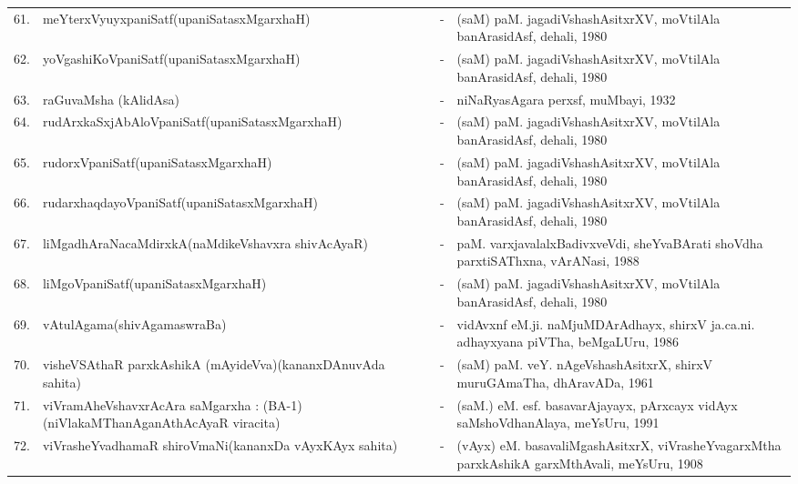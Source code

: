{\begin{longtable}{rp{6cm}cp{9cm}<{\raggedright}}
61. & meYterxVyuyxpaniSatf\newline (upaniSatasxMgarxhaH) &-& (saM) paM. jagadiVshashAsitxrXV, moVtilAla banArasidAsf, dehali, 1980\\
62. & yoVgashiKoVpaniSatf\newline (upaniSatasxMgarxhaH) &-& (saM) paM. jagadiVshashAsitxrXV, moVtilAla banArasidAsf, dehali, 1980\\
63. & raGuvaMsha (kAlidAsa) &-& niNaRyasAgara perxsf, muMbayi, 1932\\
64. & rudArxkaSxjAbAloVpaniSatf\newline (upaniSatasxMgarxhaH) &-& (saM) paM. jagadiVshashAsitxrXV, moVtilAla banArasidAsf, dehali, 1980\\
65. & rudorxVpaniSatf\newline (upaniSatasxMgarxhaH) &-& (saM) paM. jagadiVshashAsitxrXV, moVtilAla banArasidAsf, dehali, 1980\\
66. & rudarxhaqdayoVpaniSatf\newline (upaniSatasxMgarxhaH) &-& (saM) paM. jagadiVshashAsitxrXV, moVtilAla banArasidAsf, dehali, 1980\\
67. & liMgadhAraNacaMdirxkA\newline (naMdikeVshavxra shivAcAyaR) &-& paM. varxjavalalxBadivxveVdi, sheYvaBArati shoVdha parxtiSAThxna, vArANasi, 1988\\
68. & liMgoVpaniSatf\newline (upaniSatasxMgarxhaH) &-& (saM) paM. jagadiVshashAsitxrXV, moVtilAla banArasidAsf, dehali, 1980\\
69. & vAtulAgama\newline (shivAgamaswraBa) &-& vidAvxnf eM.ji. naMjuMDArAdhayx, shirxV ja.ca.ni. adhayxyana piVTha, beMgaLUru, 1986\\
70. & visheVSAthaR parxkAshikA (mAyideVva)\newline (kananxDAnuvAda sahita) &-& (saM) paM. veY. nAgeVshashAsitxrX, shirxV muruGAmaTha, dhAravADa, 1961\\
71. & viVramAheVshavxrAcAra saMgarxha : (BA-1)\newline (niVlakaMThanAganAthAcAyaR viracita) &-& (saM.) eM. esf. basavarAjayayx, pArxcayx vidAyx saMshoVdhanAlaya, meYsUru, 1991\\
72. & viVrasheYvadhamaR shiroVmaNi\newline (kananxDa vAyxKAyx sahita) &-& (vAyx) eM. basavaliMgashAsitxrX, viVrasheYvagarxMtha parxkAshikA garxMthAvali, meYsUru, 1908\\

\end{longtable}}
